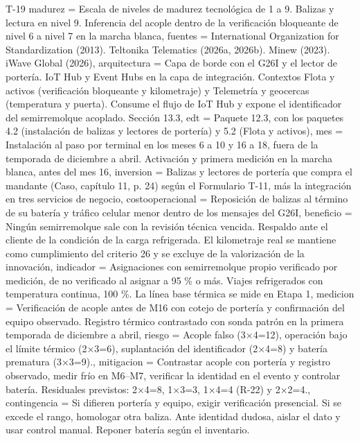 \begin{formulario}{T-19}
{  madurez = {Escala de niveles de madurez tecnológica de 1 a 9. Balizas y lectura en nivel 9. Inferencia del acople dentro de la verificación bloqueante de nivel 6 a nivel 7 en la marcha blanca},
  fuentes = {International Organization for Standardization (2013). Teltonika Telematics (2026a, 2026b). Minew (2023). iWave Global (2026)},
  arquitectura = {Capa de borde con el G26I y el lector de portería. IoT Hub y Event Hubs en la capa de integración. Contextos Flota y activos (verificación bloqueante y kilometraje) y Telemetría y geocercas (temperatura y puerta). Consume el flujo de IoT Hub y expone el identificador del semirremolque acoplado. Sección 13.3},
  edt = {Paquete 12.3, con los paquetes 4.2 (instalación de balizas y lectores de portería) y 5.2 (Flota y activos)},
  mes = {Instalación al paso por terminal en los meses 6 a 10 y 16 a 18, fuera de la temporada de diciembre a abril. Activación y primera medición en la marcha blanca, antes del mes 16},
  inversion = {Balizas y lectores de portería que compra el mandante (Caso, capítulo 11, p. 24) según el Formulario T-11, más la integración en tres servicios de negocio},
  costooperacional = {Reposición de balizas al término de su batería y tráfico celular menor dentro de los mensajes del G26I},
  beneficio = {Ningún semirremolque sale con la revisión técnica vencida. Respaldo ante el cliente de la condición de la carga refrigerada. El kilometraje real se mantiene como cumplimiento del criterio 26 y se excluye de la valorización de la innovación},
  indicador = {Asignaciones con semirremolque propio verificado por medición, de no verificado al asignar a 95 \% o más. Viajes refrigerados con temperatura continua, 100 \%. La línea base térmica se mide en Etapa 1},
  medicion = {Verificación de acople antes de M16 con cotejo de portería y confirmación del equipo observado. Registro térmico contrastado con sonda patrón en la primera temporada de diciembre a abril},
  riesgo = {Acople falso (3×4=12), operación bajo el límite térmico (2×3=6), suplantación del identificador (2×4=8) y batería prematura (3×3=9).},
  mitigacion = {Contrastar acople con portería y registro observado, medir frío en M6--M7, verificar la identidad en el evento y controlar batería. Residuales previstos: 2×4=8, 1×3=3, 1×4=4 (R-22) y 2×2=4.},
  contingencia = {Si difieren portería y equipo, exigir verificación presencial. Si se excede el rango, homologar otra baliza. Ante identidad dudosa, aislar el dato y usar control manual. Reponer batería según el inventario.}
}

\end{formulario}
